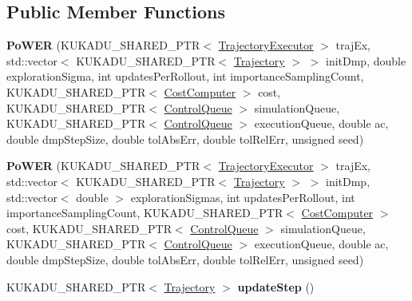 \subsection*{Public Member Functions}
\begin{DoxyCompactItemize}
\item 
\hypertarget{classkukadu_1_1PoWER_a6bd26a1f03ccde92332cd7689f7cd4c7}{{\bfseries Po\-W\-E\-R} (K\-U\-K\-A\-D\-U\-\_\-\-S\-H\-A\-R\-E\-D\-\_\-\-P\-T\-R$<$ \hyperlink{classkukadu_1_1TrajectoryExecutor}{Trajectory\-Executor} $>$ traj\-Ex, std\-::vector$<$ K\-U\-K\-A\-D\-U\-\_\-\-S\-H\-A\-R\-E\-D\-\_\-\-P\-T\-R$<$ \hyperlink{classkukadu_1_1Trajectory}{Trajectory} $>$ $>$ init\-Dmp, double exploration\-Sigma, int updates\-Per\-Rollout, int importance\-Sampling\-Count, K\-U\-K\-A\-D\-U\-\_\-\-S\-H\-A\-R\-E\-D\-\_\-\-P\-T\-R$<$ \hyperlink{classkukadu_1_1CostComputer}{Cost\-Computer} $>$ cost, K\-U\-K\-A\-D\-U\-\_\-\-S\-H\-A\-R\-E\-D\-\_\-\-P\-T\-R$<$ \hyperlink{classkukadu_1_1ControlQueue}{Control\-Queue} $>$ simulation\-Queue, K\-U\-K\-A\-D\-U\-\_\-\-S\-H\-A\-R\-E\-D\-\_\-\-P\-T\-R$<$ \hyperlink{classkukadu_1_1ControlQueue}{Control\-Queue} $>$ execution\-Queue, double ac, double dmp\-Step\-Size, double tol\-Abs\-Err, double tol\-Rel\-Err, unsigned seed)}\label{classkukadu_1_1PoWER_a6bd26a1f03ccde92332cd7689f7cd4c7}

\item 
\hypertarget{classkukadu_1_1PoWER_a3dcbc71bbb24b6364f0b9adea0c6a3d8}{{\bfseries Po\-W\-E\-R} (K\-U\-K\-A\-D\-U\-\_\-\-S\-H\-A\-R\-E\-D\-\_\-\-P\-T\-R$<$ \hyperlink{classkukadu_1_1TrajectoryExecutor}{Trajectory\-Executor} $>$ traj\-Ex, std\-::vector$<$ K\-U\-K\-A\-D\-U\-\_\-\-S\-H\-A\-R\-E\-D\-\_\-\-P\-T\-R$<$ \hyperlink{classkukadu_1_1Trajectory}{Trajectory} $>$ $>$ init\-Dmp, std\-::vector$<$ double $>$ exploration\-Sigmas, int updates\-Per\-Rollout, int importance\-Sampling\-Count, K\-U\-K\-A\-D\-U\-\_\-\-S\-H\-A\-R\-E\-D\-\_\-\-P\-T\-R$<$ \hyperlink{classkukadu_1_1CostComputer}{Cost\-Computer} $>$ cost, K\-U\-K\-A\-D\-U\-\_\-\-S\-H\-A\-R\-E\-D\-\_\-\-P\-T\-R$<$ \hyperlink{classkukadu_1_1ControlQueue}{Control\-Queue} $>$ simulation\-Queue, K\-U\-K\-A\-D\-U\-\_\-\-S\-H\-A\-R\-E\-D\-\_\-\-P\-T\-R$<$ \hyperlink{classkukadu_1_1ControlQueue}{Control\-Queue} $>$ execution\-Queue, double ac, double dmp\-Step\-Size, double tol\-Abs\-Err, double tol\-Rel\-Err, unsigned seed)}\label{classkukadu_1_1PoWER_a3dcbc71bbb24b6364f0b9adea0c6a3d8}

\item 
\hypertarget{classkukadu_1_1PoWER_a323da114f6ece16061bb82f4851c1f3a}{K\-U\-K\-A\-D\-U\-\_\-\-S\-H\-A\-R\-E\-D\-\_\-\-P\-T\-R$<$ \hyperlink{classkukadu_1_1Trajectory}{Trajectory} $>$ {\bfseries update\-Step} ()}\label{classkukadu_1_1PoWER_a323da114f6ece16061bb82f4851c1f3a}


\end{DoxyCompactItemize}
